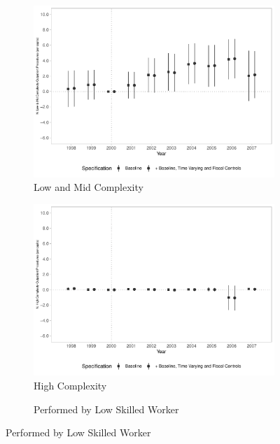 \begin{figure}[h!]
\begin{center}
    \begin{subfigure}{0.32\textwidth}
        \centering
        \caption{\scriptsize Low and Mid Complexity}\label{fig:15c}
        \includegraphics[width=\textwidth]{plots/sia_nprod_amb_lc_mun_pcapita_dist_ec29_baseline_dist_ec29_baseline_15.pdf}
    \end{subfigure}
    \begin{subfigure}{0.32\textwidth}
        \centering
        \caption{\scriptsize High Complexity}\label{fig:15d}
        \includegraphics[width=\textwidth]{plots/sia_nprod_amb_hc_mun_pcapita_dist_ec29_baseline_dist_ec29_baseline_15.pdf}
    \end{subfigure}
    \begin{subfigure}{0.32\textwidth}
        \centering
        \caption{\scriptsize Performed by Low Skilled Worker}\label{fig:15e}

\end{subfigure}
\end{center}
\end{figure}
